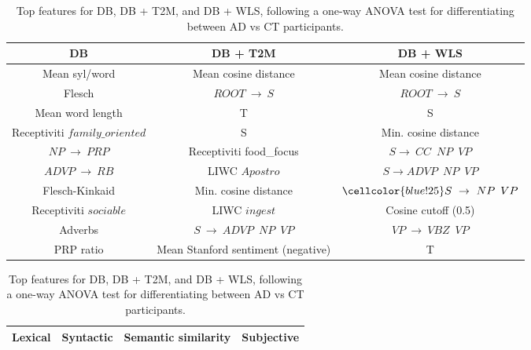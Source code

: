 \documentclass{article}
\begin{document}
\begin{table}[h]
\caption{Top features for  DB, DB + T2M, and DB + WLS, following a one-way ANOVA test for differentiating between AD vs CT participants.}
\label{features}
\centering
\begin{tabular}{|c|c|c|}\hline
\textbf{DB} & \textbf{DB + T2M} & \textbf{DB + WLS} \\ \hline
\cellcolor{red!50}Mean syl/word & \cellcolor{green!75} Mean cosine distance &	 \cellcolor{green!75} Mean cosine distance \\ \hline
\cellcolor{yellow!} Flesch & \cellcolor{blue!25} $ROOT\  \rightarrow \ S$	& \cellcolor{blue!25} $ROOT\  \rightarrow \ S$ \\  \hline
\cellcolor{red!50}Mean word length &	\cellcolor{blue!25}T&	\cellcolor{blue!25}S\\  \hline
\cellcolor{yellow!} Receptiviti $family\_oriented$	 & \cellcolor{blue!25}S	& \cellcolor{green!75}  Min. cosine distance\\  \hline
\cellcolor{blue!25} $NP \ \rightarrow \ PRP$ & \cellcolor{yellow!} Receptiviti food\_focus & \cellcolor{blue!25}$S \rightarrow \ CC\,\,\,NP\,\,\,VP$\\  \hline
\cellcolor{blue!25} $ADVP \ \rightarrow  \ RB$	& \cellcolor{yellow!} LIWC $Apostro$ &	\cellcolor{blue!25} $S \rightarrow ADVP\,\,\,NP\,\,\,VP$\\  \hline
\cellcolor{yellow!} Flesch-Kinkaid	& \cellcolor{green!75}  Min. cosine distance & $ \cellcolor{blue!25}S \ \rightarrow \ NP\,\,\,VP$ \\  \hline
\cellcolor{yellow!} Receptiviti $sociable$ &	\cellcolor{yellow!} LIWC $ingest$ &	\cellcolor{green!75}  Cosine cutoff (0.5) \\  \hline
\cellcolor{red!50}Adverbs & \cellcolor{blue!25} $S \ \rightarrow  \ ADVP\,\,\,NP\,\,\,VP$ & \cellcolor{blue!25} $VP \ \rightarrow \ VBZ\,\,\,VP$ \\  \hline
\cellcolor{red!50}PRP ratio & \cellcolor{yellow!} Mean Stanford sentiment (negative) & \cellcolor{blue!25}T \\  \hline
\end{tabular}

\begin{tabular}{|c|c|c|c|}\hline
\cellcolor{red!50}Lexical& \cellcolor{blue!25} Syntactic & \cellcolor{green!75}Semantic similarity & \cellcolor{yellow!}Subjective\\
\hline
\end{tabular}

\end{table}
\end{document}
